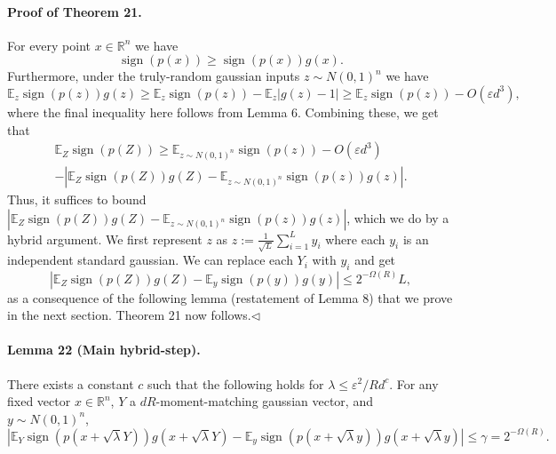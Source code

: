 \paragraph{Proof of Theorem 21.} For every point $x\in\mathbb R^n$ we have
\[\operatorname{sign}(p(x))\geq\operatorname{sign}(p(x))g(x).\]
Furthermore, under the truly-random gaussian inputs $z\sim N(0,1)^n$ we have
\[\mathbb E_z\operatorname{sign}(p(z))g(z)\geq\mathbb E_z\operatorname{sign}(p(z))-\mathbb E_z|g(z)-1|\geq\mathbb E_z\operatorname{sign}(p(z))-O(\varepsilon d^3),\]
where the final inequality here follows from Lemma 6. Combining these, we get that
\begin{multline*}
\mathbb E_Z\operatorname{sign}(p(Z))\geq\mathbb E_{z\sim N(0,1)^n}\operatorname{sign}(p(z))-O(\varepsilon d^3)\\
-\left|\mathbb E_Z\operatorname{sign}(p(Z))g(Z)-\mathbb E_{z\sim N(0,1)^n}\operatorname{sign}(p(z))g(z)\right|.
\end{multline*}
Thus, it suffices to bound $|\mathbb E_Z\operatorname{sign}(p(Z))g(Z)-\mathbb E_{z\sim N(0,1)^n}\operatorname{sign}(p(z))g(z)|$, which we do by a hybrid argument. We first represent $z$ as $z:=\frac1{\sqrt L}\sum_{i=1}^Ly_i$ where each $y_i$ is an independent standard gaussian. We can replace each $Y_i$ with $y_i$ and get
\[|\mathbb E_Z\operatorname{sign}(p(Z))g(Z)-\mathbb E_y\operatorname{sign}(p(y))g(y)|\leq2^{-\Omega(R)}L,\]
as a consequence of the following lemma (restatement of Lemma 8) that we prove in the next section. Theorem 21 now follows.\hfill$\triangleleft$
\paragraph{Lemma 22 (Main hybrid-step).} There exists a constant $c$ such that the following holds for $\lambda\leq\varepsilon^2/Rd^c$. For any fixed vector $x\in\mathbb R^n$, $Y$ a $dR$-moment-matching gaussian vector, and $y\sim N(0,1)^n$,
\[|\mathbb E_Y\operatorname{sign}(p(x+\sqrt\lambda Y))g(x+\sqrt\lambda Y)-\mathbb E_y\operatorname{sign}(p(x+\sqrt\lambda y))g(x+\sqrt\lambda y)|\leq\gamma=2^{-\Omega(R)}.\]
